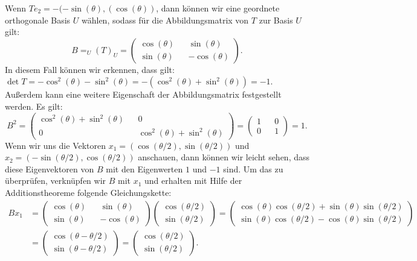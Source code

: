 Wenn $Te_2 = - (-\sin(\theta),(\cos(\theta))$, dann können wir eine geordnete orthogonale Basis $U$ wählen, sodass für die Abbildungsmatrix von $T$ zur Basis $U$ gilt:
$$B = _U(T)_U = \begin{pmatrix}
	\cos(\theta) && \sin(\theta) \\
	\sin(\theta) && -\cos(\theta)
\end{pmatrix}.$$
In diesem Fall können wir erkennen, dass gilt: $\det T = -\cos^2(\theta) -\sin^2(\theta) = -(\cos^2(\theta) +\sin^2(\theta)) = -1$. Außerdem kann eine weitere Eigenschaft der Abbildungsmatrix festgestellt werden. Es gilt:
$$B^2 = \begin{pmatrix}
	\cos^2(\theta) + \sin^2(\theta) && 0 \\
	0 && \cos^2(\theta) + \sin^2(\theta)
\end{pmatrix} = \begin{pmatrix}
	1 && 0 \\
	0 && 1 
\end{pmatrix} = 1.
$$Wenn wir uns die Vektoren $x_1 = (\cos(\theta/2),\sin(\theta/2))$ und $x_2 = (-\sin(\theta/2),\cos(\theta/2))$ anschauen, dann können wir leicht sehen, dass diese Eigenvektoren von $B$ mit den Eigenwerten $1$ und $-1$ sind. Um das zu überprüfen, verknüpfen wir $B$ mit $x_1$ und erhalten mit Hilfe der Additionstheoreme folgende Gleichungskette:
\begin{align*}
	Bx_1 &= \begin{pmatrix}
		\cos(\theta) && \sin(\theta) \\
		\sin(\theta) && -\cos(\theta)
	\end{pmatrix} \begin{pmatrix}
		\cos(\theta/2) \\
		\sin(\theta/2)
	\end{pmatrix} = \begin{pmatrix}
		\cos(\theta)\cos(\theta/2)+\sin(\theta)\sin(\theta/2) \\
		\sin(\theta)\cos(\theta/2)-\cos(\theta)\sin(\theta/2)
	\end{pmatrix} \\ &= \begin{pmatrix}
		\cos(\theta - \theta/2) \\
		\sin(\theta - \theta/2)
	\end{pmatrix} = \begin{pmatrix}
		\cos(\theta/2) \\
		\sin(\theta/2)
	\end{pmatrix}.
\end{align*}
